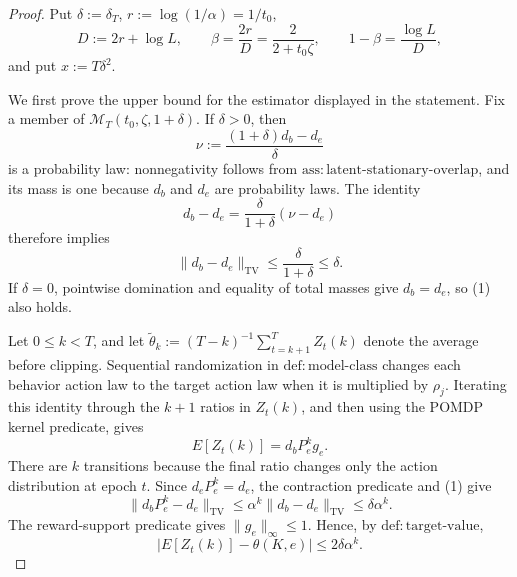 \documentclass{article}
\begin{document}
\begin{proof}
Put \(\delta:=\delta_T\), \(r:=\log(1/\alpha)=1/t_0\),
\[
 D:=2r+\log L,
 \qquad
 \beta=\frac{2r}{D}=\frac{2}{2+t_0\zeta},
 \qquad
 1-\beta=\frac{\log L}{D},
\]
and put \(x:=T\delta^2\).

We first prove the upper bound for the estimator displayed in the statement.  Fix a member of \(\mathcal M_T(t_0,\zeta,1+\delta)\).  If \(\delta>0\), then
\[
 \nu:=\frac{(1+\delta)d_b-d_e}{\delta}
\]
is a probability law: nonnegativity follows from \(\mathrm{ass{:}latent\text{-}stationary\text{-}overlap}\), and its mass is one because \(d_b\) and \(d_e\) are probability laws.  The identity
\[
 d_b-d_e=\frac{\delta}{1+\delta}(\nu-d_e)
\]
therefore implies
\[
 \lVert d_b-d_e\rVert_{\mathrm{TV}}
 \le \frac{\delta}{1+\delta}\le\delta. \tag{1}
\]
If \(\delta=0\), pointwise domination and equality of total masses give \(d_b=d_e\), so (1) also holds.

Let \(0\le k<T\), and let \(\widetilde\theta_k:=(T-k)^{-1}\sum_{t=k+1}^T Z_t(k)\) denote the average before clipping.  Sequential randomization in \(\mathrm{def{:}model\text{-}class}\) changes each behavior action law to the target action law when it is multiplied by \(\rho_j\).  Iterating this identity through the \(k+1\) ratios in \(Z_t(k)\), and then using the POMDP kernel predicate, gives
\[
 E[Z_t(k)]=d_bP_e^kg_e.
\]
There are \(k\) transitions because the final ratio changes only the action distribution at epoch \(t\).  Since \(d_eP_e^k=d_e\), the contraction predicate and (1) give
\[
 \lVert d_bP_e^k-d_e\rVert_{\mathrm{TV}}
 \le \alpha^k\lVert d_b-d_e\rVert_{\mathrm{TV}}
 \le\delta\alpha^k.
\]
The reward-support predicate gives \(\lVert g_e\rVert_\infty\le1\).  Hence, by \(\mathrm{def{:}target\text{-}value}\),
\[
 \bigl|E[Z_t(k)]-\theta(K,e)\bigr|
 \le2\delta\alpha^k. \tag{2}
\]


\end{proof}
\end{document}
